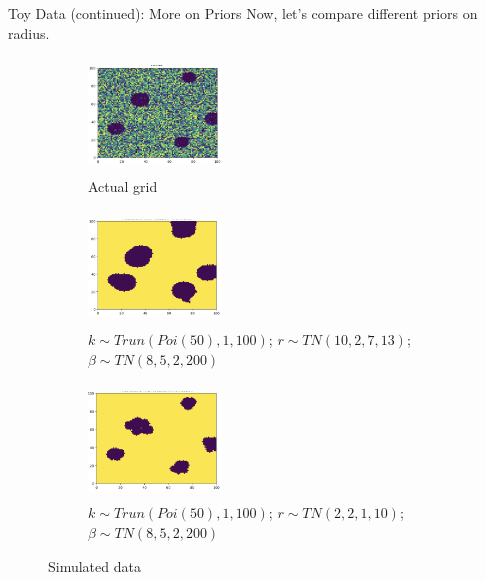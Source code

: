 \documentclass[10pt,mathserif]{beamer}
\begin{document}
\begin{frame}{Toy Data (continued): More on Priors}
Now, let's compare different priors on radius.
\begin{figure}[t!]
    \centering
    \begin{subfigure}[t]{0.3\textwidth}
        \centering
        \includegraphics[height=1.2in, width=1.4in]{../BDC_gridactual}
        \caption{Actual grid}
    \end{subfigure}%
    \begin{subfigure}[t]{0.3\textwidth}
        \centering
        \includegraphics[height=1.2in, width=1.4in]{../BDC_grid4}
        \caption{ $k \sim Trun(Poi(50), 1, 100)$; $r \sim TN(10, 2, 7, 13)$; $\beta \sim TN(8, 5, 2, 200)$}
    \end{subfigure}%
        \begin{subfigure}[t]{0.3\textwidth}
        \centering
        \includegraphics[height=1.2in, width=1.4in]{../BDC_grid5}
        \caption{ $k \sim Trun(Poi(50), 1, 100)$; $r \sim TN(2, 2, 1, 10)$; $\beta \sim TN(8, 5, 2, 200)$}
    \end{subfigure}
    \caption{Simulated data}
\end{figure}
\end{frame}
\end{document}
